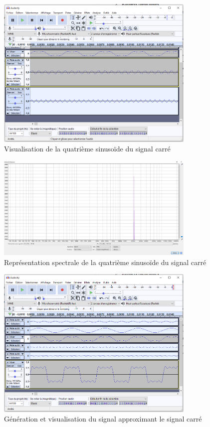 \documentclass[a4paper]{article}
\begin{document}
\begin{figure}[H]
    \centering
    \includegraphics[width=0.85\textwidth]{images/SignalCarre016.PNG}
    \caption{Visualisation de la quatrième sinusoïde du signal carré}
    \label{fig:SignalCarre016}
\end{figure}

\begin{figure}[H]
    \centering
    \includegraphics[width=0.85\textwidth]{images/SignalCarre024.PNG}
    \caption{Représentation spectrale de la quatrième sinusoïde du signal carré}
    \label{fig:SignalCarre024}
\end{figure}


\begin{figure}[H]
    \centering
    \includegraphics[width=0.85\textwidth]{images/SignalCarre019.PNG}
    \caption{Génération et visualisation du signal approximant le signal carré}
    \label{fig:SignalCarre019}
\end{figure}
\end{document}
